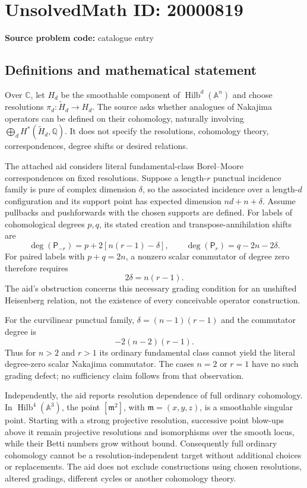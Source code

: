 \documentclass[11pt]{article}
\newcommand{\Q}{\mathbb{Q}}
\newcommand{\C}{\mathbb{C}}
\begin{document}
\section*{UnsolvedMath ID: 20000819}
\textbf{Source problem code:} catalogue entry
\subsection{Definitions and mathematical statement}
Over $\C$, let $H_d$ be the smoothable component of $\operatorname{Hilb}^d(\mathbb A^n)$ and choose resolutions $\pi_d:\widetilde H_d\to H_d$. The source asks whether analogues of Nakajima operators can be defined on their cohomology, naturally involving $\bigoplus_dH^*(\widetilde H_d,\Q)$. It does not specify the resolutions, cohomology theory, correspondences, degree shifts or desired relations.

The attached aid considers literal fundamental-class Borel--Moore correspondences on fixed resolutions. Suppose a length-$r$ punctual incidence family is pure of complex dimension $\delta$, so the associated incidence over a length-$d$ configuration and its support point has expected dimension $nd+n+\delta$. Assume pullbacks and pushforwards with the chosen supports are defined. For labels of cohomological degrees $p,q$, its stated creation and transpose-annihilation shifts are
\[
\deg(\mathsf P_{-r})=p+2[n(r-1)-\delta],\qquad
\deg(\mathsf P_r)=q-2n-2\delta.
\]
For paired labels with $p+q=2n$, a nonzero scalar commutator of degree zero therefore requires
\[
2\delta=n(r-1).
\]
The aid's obstruction concerns this necessary grading condition for an unshifted Heisenberg relation, not the existence of every conceivable operator construction.

For the curvilinear punctual family, $\delta=(n-1)(r-1)$ and the commutator degree is
\[
-2(n-2)(r-1).
\]
Thus for $n>2$ and $r>1$ its ordinary fundamental class cannot yield the literal degree-zero scalar Nakajima commutator. The cases $n=2$ or $r=1$ have no such grading defect; no sufficiency claim follows from that observation.

Independently, the aid reports resolution dependence of full ordinary cohomology. In $\operatorname{Hilb}^4(\mathbb A^3)$, the point $[\mathfrak m^2]$, with $\mathfrak m=(x,y,z)$, is a smoothable singular point. Starting with a strong projective resolution, successive point blow-ups above it remain projective resolutions and isomorphisms over the smooth locus, while their Betti numbers grow without bound. Consequently full ordinary cohomology cannot be a resolution-independent target without additional choices or replacements. The aid does not exclude constructions using chosen resolutions, altered gradings, different cycles or another cohomology theory.
\end{document}
